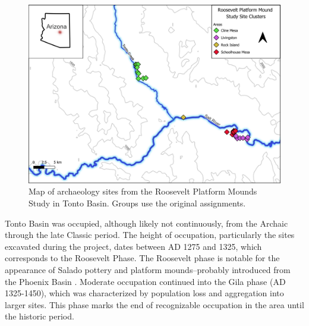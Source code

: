 \documentclass[]{interact}
\theoremstyle{plain}%
\theoremstyle{definition}
\theoremstyle{remark}
\begin{document}
\begin{figure}
\includegraphics[width=1\linewidth]{figures/TontoBasinSitesv3} \caption{Map of archaeology sites from the Roosevelt Platform Mounds Study in Tonto Basin. Groups use the original assignments.}\label{fig:TontoBasinSites}
\end{figure}

Tonto Basin was occupied, although likely not continuously, from the
Archaic through the late Classic period. The height of occupation,
particularly the sites excavated during the project, dates between AD
1275 and 1325, which corresponds to the Roosevelt Phase. The Roosevelt
phase is notable for the appearance of Salado pottery and platform
mounds--probably introduced from the Phoenix Basin \citep{Elson1996-ym}.
Moderate occupation continued into the Gila phase (AD 1325-1450), which
was characterized by population loss and aggregation into larger sites.
This phase marks the end of recognizable occupation in the area until
the historic period.
\end{document}
